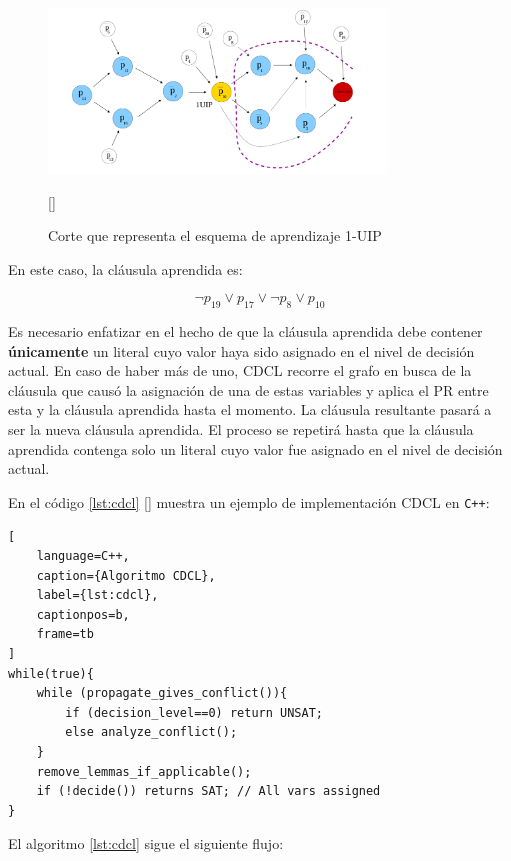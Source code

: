 \begin{figure}[ht]
    \centering
    \includegraphics[width=0.8\textwidth]{Graphics/first_uip.png}
    \caption{Corte que representa el esquema de aprendizaje 1-UIP}
    [\cite{oliveras2009dpll_cdcl}]
    \label{fig:graph_1-uip}
\end{figure}

En este caso, la cl\'ausula aprendida es:

\begin{equation*}
\neg p_{19} \lor p_{17} \lor \neg p_8 \lor p_{10}
\end{equation*}


Es necesario enfatizar en el hecho de que la cl\'ausula aprendida debe contener \textbf{\'unicamente} un literal cuyo valor haya sido asignado en el nivel de decisi\'on actual. En caso de haber m\'as de uno, CDCL recorre el grafo en busca de la cl\'ausula que caus\'o la asignaci\'on de una de estas variables y aplica el PR entre esta y la cl\'ausula aprendida hasta el momento. La cl\'ausula resultante pasar\'a a ser la nueva cl\'ausula aprendida. El proceso se repetir\'a hasta que la cl\'ausula aprendida contenga solo un literal cuyo valor fue asignado en el nivel de decisi\'on actual.

En el c\'odigo \ref{lst:cdcl} [\cite{oliveras2009dpll_cdcl}] muestra un ejemplo de implementaci\'on CDCL en \texttt{C++}:

\begin{lstlisting}[
    language=C++,
    caption={Algoritmo CDCL},
    label={lst:cdcl},
    captionpos=b,
    frame=tb
]
while(true){
	while (propagate_gives_conflict()){
		if (decision_level==0) return UNSAT;
		else analyze_conflict();
	}
	remove_lemmas_if_applicable();
	if (!decide()) returns SAT; // All vars assigned
}
\end{lstlisting}

El algoritmo \ref{lst:cdcl} sigue el siguiente flujo:

